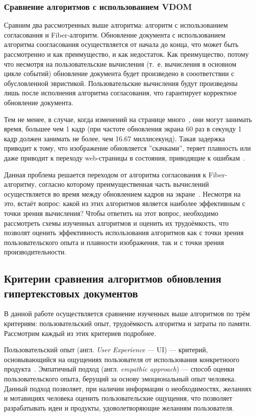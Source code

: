 \subsubsection{Сравнение алгоритмов с использованием VDOM}

Сравним два рассмотренных выше алгоритма: алгоритм с использованием согласования и Fiber-алгоритм. Обновление документа с использованием алгоритма соогласования осуществляется от начала до конца, что может быть рассмотренно и как преимущество, и как недостаток. Как преимущество, потому что несмотря на пользовательские вычисления (т.~е. вычисления в основном цикле событий) обновление документа будет произведено в сооответствии с обусловленной эвристикой. Пользовательские вычисления будут произведены лишь после исполнения алгоритма согласования, что гарантирует корректное обновление документа.

Тем не менее, в случае, когда изменений на странице много~\cite{react-dive}, они могут занимать время, большее чем 1 кадр (при частоте обновления экрана 60 раз в секунду 1 кадр должен занимать не более, чем 16.67 миллисекунд). Такая задержка приводит к тому, что изображение обновляется ''скачками'', теряет плавность или даже приводит к переходу web-страницы в состояния, приводящие к ошибкам~\cite{fiber}. 

 Данная проблема решается переходом от алгоритма согласования к Fiber-алгоритму, согласно которому преимущественная часть вычислений осуществляется во время между обновлением кадров на экране~\cite{requestidlecallback}. Несмотря на это, встаёт вопрос: какой из этих алгоритмов является наиболее эффективным с точки зрения вычисления? Чтобы ответить на этот вопрос, необходимо рассмотреть схемы изученных алгоритмов и оценить их трудоёмкость, что позволят оценить эффективность использования алгоритмов как с точки зрения пользовательского опыта и плавности изображения, так и с точки зрения производительности.

\subsection{Критерии сравнения алгоритмов обновления гипертекстовых документов}

В данной работе осуществляется сравнение изученных выше алгоритмов по трём критериям: пользовательский опыт, трудоёмкость алгоритма и затраты по памяти. Рассмотрим каждый из этих критериев подробнее.

Пользовательский опыт (англ. \textit{User Experience} --- UI) --- критерий, основывающийся на ощущениях пользователя от использования конкретноого продукта~\cite{ui-definition}. Эмпатичный подход (англ. \textit{empathic approach}) --- способ оценки пользовательского опыта, берущий за основу эмоциональный опыт человека. Данный подход позволяет, при наличии информации о необходимостях, желаниях и мотавициях человека оценить пользовательские ощущения, что позволяет разрабатывать идеи и продукты, удоволетворяющие желаниям пользователя. 

